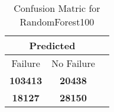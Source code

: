\begin{table}[] 
\caption{Confusion Matric for RandomForest100} 
\label{Table: Prediction Accuracy-DMDRandomForest100OnlySunEKF-resetReflection-Reflection} 
\centering 
\begin{tabular} 
 {@{}ccc@{}} 
\toprule 
\multicolumn{2}{c}{\textbf{Predicted}}
 \\ \midrule 
\multicolumn{1}{|c|}{Failure} & 
\multicolumn{1}{c|}{No Failure}
 \\ \midrule 
\multicolumn{1}{|c|}{\color{green}\textbf{103413}} & 
\multicolumn{1}{c|}{\color{red}\textbf{20438}}
 \\ \midrule 
\multicolumn{1}{|c|}{\color{red}\textbf{18127}} & 
\multicolumn{1}{c|}{\color{green}\textbf{28150}}
 \\ \bottomrule 
\end{tabular} 
\end{table} 
